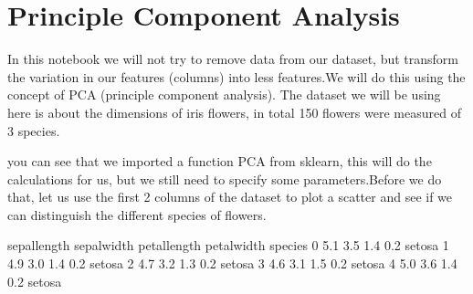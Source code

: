 \documentclass[letterpaper,10pt,english]{jupyterBook}
\begin{document}
\chapter{Principle Component Analysis}
\label{\detokenize{c5_data_exploration/principle_component_analysis:principle-component-analysis}}\label{\detokenize{c5_data_exploration/principle_component_analysis::doc}}
\sphinxAtStartPar
In this notebook we will not try to remove data from our dataset, but transform the variation in our features (columns) into less features.We will do this using the concept of PCA (principle component analysis).
The dataset we will be using here is about the dimensions of iris flowers, in total 150 flowers were measured of 3 species.

\begin{sphinxVerbatim}[commandchars=\\\{\}]
   
   
   
  
\end{sphinxVerbatim}

\sphinxAtStartPar
you can see that we imported a function PCA from sklearn, this will do the calculations for us, but we still need to specify some parameters.Before we do that, let us use the first 2 columns of the dataset to plot a scatter and see if we can distinguish the different species of flowers.

\begin{sphinxVerbatim}[commandchars=\\\{\}]
\end{sphinxVerbatim}

\begin{sphinxVerbatim}[commandchars=\\\{\}]
   sepal\PYGZus{}length  sepal\PYGZus{}width  petal\PYGZus{}length  petal\PYGZus{}width species
0           5.1          3.5           1.4          0.2  setosa
1           4.9          3.0           1.4          0.2  setosa
2           4.7          3.2           1.3          0.2  setosa
3           4.6          3.1           1.5          0.2  setosa
4           5.0          3.6           1.4          0.2  setosa
\end{sphinxVerbatim}
\end{document}
